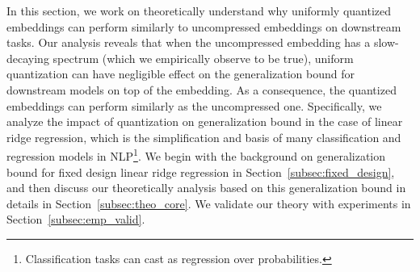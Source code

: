 In this section, we work on theoretically understand why uniformly quantized embeddings can perform similarly to uncompressed embeddings on downstream tasks.  
Our analysis reveals that when the uncompressed embedding has a slow-decaying spectrum (which we empirically observe to be true), uniform quantization can have negligible effect on the generalization bound for downstream models on top of the embedding. As a consequence, the quantized embeddings can perform similarly as the uncompressed one. 
Specifically, we analyze the impact of quantization on generalization bound in the case of linear ridge regression, which is the simplification and basis of many classification and regression models in NLP\footnote{Classification tasks can cast as regression over probabilities.}. We begin with the background on generalization bound for fixed design linear ridge regression in Section~\ref{subsec:fixed_design}, and then discuss our theoretically analysis based on this generalization bound in details in Section~\ref{subsec:theo_core}. We validate our theory with experiments in Section~\ref{subsec:emp_valid}. 


